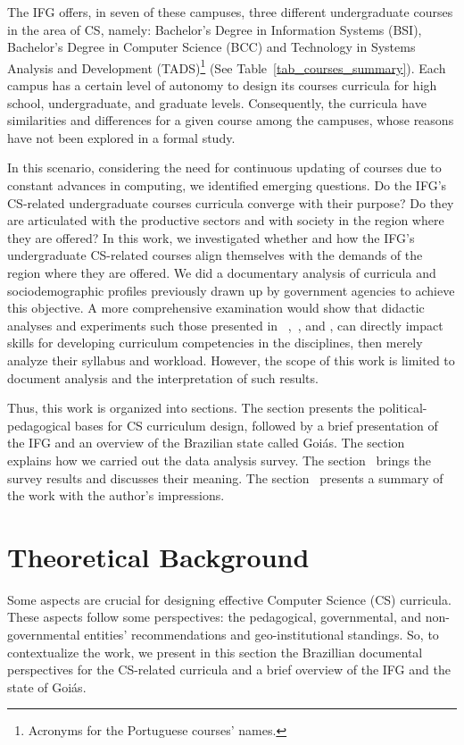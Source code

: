 \documentclass[sigconf, review]{educomp}
\begin{document}
The IFG offers, in seven of these campuses, three different undergraduate courses in the area of CS, namely:
Bachelor's Degree in Information Systems (BSI), Bachelor's Degree in Computer Science (BCC) and Technology in Systems Analysis and Development (TADS)\footnote{Acronyms for the Portuguese courses' names.} (See Table~\ref{tab_courses_summary}).
Each campus has a certain level of autonomy to design its courses curricula for high school, undergraduate, and graduate levels.
Consequently, the curricula have similarities and differences for a given course among the campuses, whose reasons have not been explored in a formal study.

In this scenario, considering the need for continuous updating of courses due to constant advances in computing, we identified emerging questions.
Do the IFG's CS-related undergraduate courses curricula converge with their purpose? 
Do they are articulated with the productive sectors and with society in the region where they are offered?
In this work, we investigated whether and how the IFG's undergraduate CS-related courses align themselves with the demands of the region where they are offered.
We did a documentary analysis of curricula and sociodemographic profiles previously drawn up by government agencies to achieve this objective.
A more comprehensive examination would show that didactic analyses and experiments such those presented in ~\cite{educompA},~\cite{ duran2018towards}, and \cite{massa2021docentes}, can directly impact skills for developing curriculum competencies in the disciplines, then merely analyze their syllabus and workload.
However, the scope of this work is limited to document analysis and the interpretation of such results.

Thus, this work is organized into sections. 
The  section presents the political-pedagogical bases for CS curriculum design, followed by a brief presentation of the IFG and an overview of the Brazilian state called Goiás. 
The section~ explains how we carried out the data analysis survey. 
The section~ brings the survey results and discusses their meaning. 
The section~ presents a summary of the work with the author's impressions.

\section{Theoretical Background}\label{TheoreticalBackground}
Some aspects are crucial for designing effective Computer Science (CS) curricula.
These aspects follow some perspectives: the pedagogical, governmental, and non-governmental entities' recommendations and geo-institutional standings.
So, to contextualize the work, we present in this section the Brazillian documental perspectives for the CS-related curricula and a brief overview of the IFG and the state of Goiás.
\end{document}
